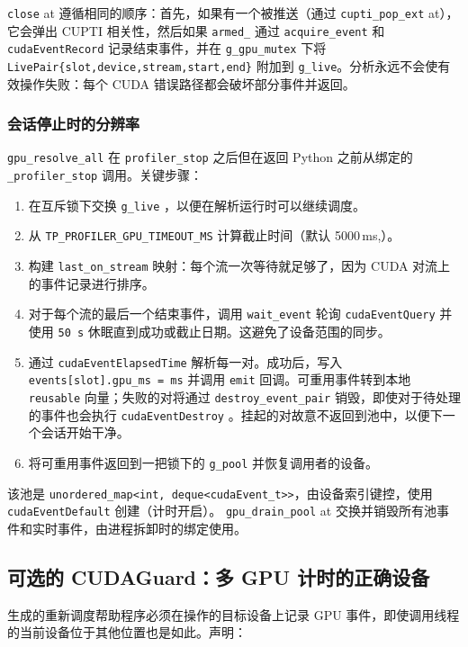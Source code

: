 \texttt{close} at 遵循相同的顺序：首先，如果有一个被推送（通过 \texttt{cupti\_pop\_ext} at），它会弹出 CUPTI 相关性，然后如果 \texttt{armed\_} 通过 \texttt{acquire\_event} 和 \texttt{cudaEventRecord} 记录结束事件，并在 \texttt{g\_gpu\_mutex} 下将 \texttt{LivePair\{slot,device,stream,start,end\}} 附加到 \texttt{g\_live}。分析永远不会使有效操作失败：每个 CUDA 错误路径都会破坏部分事件并返回。

\subsubsection{会话停止时的分辨率}

\texttt{gpu\_resolve\_all} 在 \texttt{profiler\_stop} 之后但在返回 Python 之前从绑定的 \texttt{\_profiler\_stop} 调用。关键步骤：

\begin{enumerate}[leftmargin=1.4em]
\item 在互斥锁下交换 \texttt{g\_live} ，以便在解析运行时可以继续调度。
\item 从 \texttt{TP\_PROFILER\_GPU\_TIMEOUT\_MS} 计算截止时间（默认 5000\,ms,）。
\item 构建 \texttt{last\_on\_stream} 映射：每个流一次等待就足够了，因为 CUDA 对流上的事件记录进行排序。
\item 对于每个流的最后一个结束事件，调用 \texttt{wait\_event} 轮询 \texttt{cudaEventQuery} 并使用 \texttt{50\,\textmu s} 休眠直到成功或截止日期。这避免了设备范围的同步。
\item 通过 \texttt{cudaEventElapsedTime} 解析每一对。成功后，写入 \texttt{events[slot].gpu\_ms = ms} 并调用 \texttt{emit} 回调。可重用事件转到本地 \texttt{reusable} 向量；失败的对将通过 \texttt{destroy\_event\_pair} 销毁，即使对于待处理的事件也会执行 \texttt{cudaEventDestroy} 。挂起的对故意不返回到池中，以便下一个会话开始干净。
\item 将可重用事件返回到一把锁下的 \texttt{g\_pool} 并恢复调用者的设备。
\end{enumerate}

该池是 \texttt{unordered\_map<int, deque<cudaEvent\_t>>}，由设备索引键控，使用 \texttt{cudaEventDefault} 创建（计时开启）。 \texttt{gpu\_drain\_pool} at 交换并销毁所有池事件和实时事件，由进程拆卸时的绑定使用。

\subsection{可选的 CUDAGuard：多 GPU 计时的正确设备}

生成的重新调度帮助程序必须在操作的目标设备上记录 GPU 事件，即使调用线程的当前设备位于其他位置也是如此。声明：

